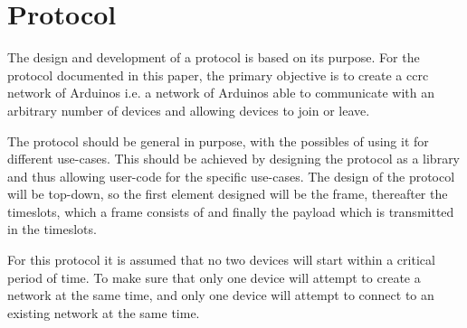 \section{Protocol}
The design and development of a protocol is based on its purpose.
For the protocol documented in this paper, the primary objective is to create a \acrlong{ccrc} network of Arduinos i.e. a network of Arduinos able to communicate with an arbitrary number of devices and allowing devices to join or leave.

The protocol should be general in purpose, with the possibles of using it for different use-cases.
This should be achieved by designing the protocol as a library and thus allowing user-code for the specific use-cases.
The design of the protocol will be top-down, so the first element designed will be the frame, thereafter the timeslots, which a frame consists of and finally the payload which is transmitted in the timeslots. 

For this protocol it is assumed that no two devices will start within a critical period of time.
To make sure that only one device will attempt to create a network at the same time, and only one device will attempt to connect to an existing network at the same time. 
